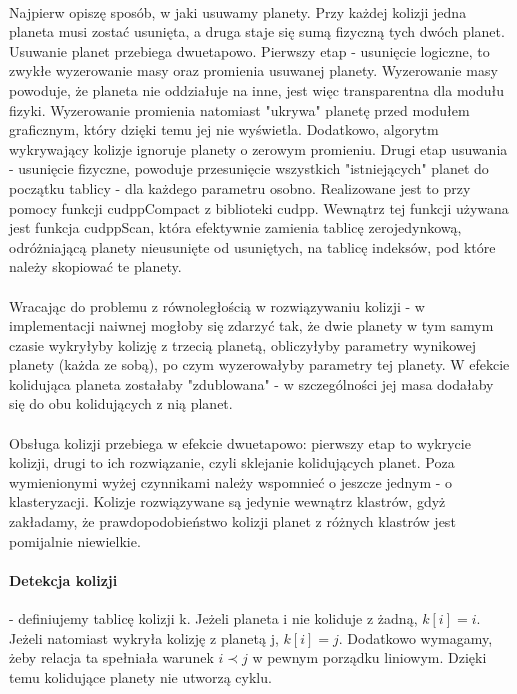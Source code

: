 \paragraph{} Najpierw opiszę sposób, w jaki usuwamy planety. Przy każdej kolizji jedna planeta musi zostać usunięta, a druga staje się sumą fizyczną tych dwóch planet. Usuwanie planet przebiega dwuetapowo. Pierwszy etap - usunięcie logiczne, to zwykłe wyzerowanie masy oraz promienia usuwanej planety. Wyzerowanie masy powoduje, że planeta nie oddziałuje na inne, jest więc transparentna dla modułu fizyki. Wyzerowanie promienia natomiast "ukrywa" planetę przed modułem graficznym, który dzięki temu jej nie wyświetla. Dodatkowo, algorytm wykrywający kolizje ignoruje planety o zerowym promieniu.
Drugi etap usuwania - usunięcie fizyczne, powoduje przesunięcie wszystkich "istniejących" planet do początku tablicy - dla każdego parametru osobno. Realizowane jest to przy pomocy funkcji cudppCompact z biblioteki cudpp.
Wewnątrz tej funkcji używana jest funkcja cudppScan, która efektywnie zamienia tablicę zerojedynkową, odróżniającą planety nieusunięte od usuniętych, na tablicę indeksów, pod które należy skopiować te planety.

\paragraph{} Wracając do problemu z równoległością w rozwiązywaniu kolizji - w implementacji naiwnej mogłoby się zdarzyć tak, że dwie planety w tym samym czasie wykryłyby kolizję z trzecią planetą, obliczyłyby parametry wynikowej planety (każda ze sobą), po czym wyzerowałyby parametry tej planety. W efekcie kolidująca planeta zostałaby "zdublowana" - w szczególności jej masa dodałaby się do obu kolidujących z nią planet.

\paragraph{} Obsługa kolizji przebiega w efekcie dwuetapowo: pierwszy etap to wykrycie kolizji, drugi to ich rozwiązanie, czyli sklejanie kolidujących planet. Poza wymienionymi wyżej czynnikami należy wspomnieć o jeszcze jednym - o klasteryzacji. Kolizje rozwiązywane są jedynie wewnątrz klastrów, gdyż zakładamy, że prawdopodobieństwo kolizji planet z różnych klastrów jest pomijalnie niewielkie.

\paragraph{Detekcja kolizji} - definiujemy tablicę kolizji k. Jeżeli planeta i nie koliduje z żadną, \ensuremath{k[i] = i}. Jeżeli natomiast wykryła kolizję z planetą j, \ensuremath{k[i] = j}. Dodatkowo wymagamy, żeby relacja ta spełniała warunek \ensuremath{i\prec j} w pewnym porządku liniowym. Dzięki temu kolidujące planety nie utworzą cyklu.

